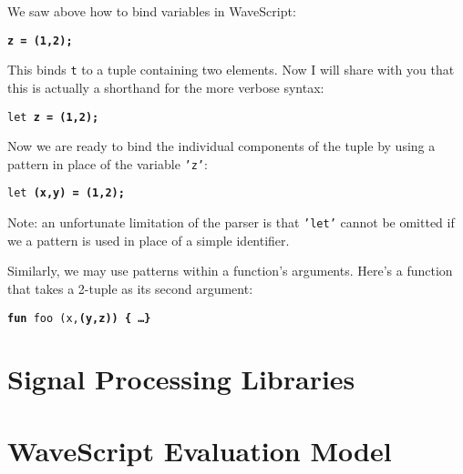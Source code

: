 We saw above how to bind variables in WaveScript:
\begin{center}
{\tt \bf{z} = (1,2);}
\end{center}
This binds {\tt t} to a tuple containing two elements.  
Now I will share with you that this is actually a shorthand for the
more verbose syntax:
\begin{center}
{\tt let \bf{z} = (1,2);}
\end{center}
Now we are ready to bind the individual components of the tuple by using
a pattern in place of the variable {\tt 'z'}:
\begin{center}
{\tt let \bf{(x,y)} = (1,2);}
\end{center}
Note: an unfortunate limitation of the parser is that {\tt 'let'} cannot be
omitted if we a pattern is used in place of a simple identifier.

Similarly, we may use patterns within a function's arguments.  Here's
a function that takes a 2-tuple as its second argument:

\begin{center}
{\tt {\bf fun} foo (x,\bf{(y,z)}) \{ \dots \}}
\end{center}


\chapter{Signal Processing Libraries}



\chapter{WaveScript Evaluation Model}





